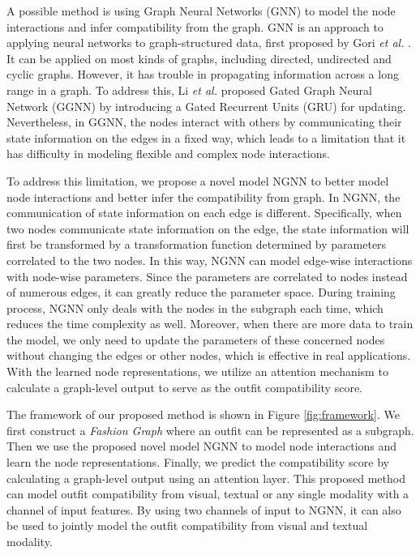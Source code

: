 \documentclass[sigconf]{acmart}
\begin{document}
A possible method is using Graph Neural Networks (GNN) to model the node interactions and infer compatibility from the graph.
GNN is an approach to applying neural networks to graph-structured data, first proposed by Gori \emph{et al.} \cite{gori2005new}.
It can be applied on most kinds of graphs, including directed, undirected and cyclic graphs. However, it has trouble in propagating information across a long range in a graph. To address this, Li \emph{et al.} \cite{li2015gated} proposed Gated Graph Neural Network (GGNN) by introducing a Gated Recurrent Units (GRU) for updating. Nevertheless, in GGNN, the nodes interact with others by communicating their state information on the edges in a fixed way, which leads to a limitation that it has difficulty in modeling flexible and complex node interactions.


To address this limitation, we propose a novel model NGNN to better model node interactions and better infer the compatibility from graph.
In NGNN, the communication of state information on each edge is different.
Specifically, when two nodes communicate state information on the edge, the state information will first be transformed by a transformation function determined by parameters correlated to the two nodes.
In this way, NGNN can model edge-wise interactions with node-wise parameters.
Since the parameters are correlated to nodes instead of numerous edges, it can greatly reduce the parameter space.
During training process, NGNN only deals with the nodes in the subgraph each time, which reduces the time complexity as well. Moreover, when there are more data to train the model, we only need to update the parameters of these concerned nodes without changing the edges or other nodes, which is effective in real applications.
With the learned node representations, we utilize an attention mechanism to calculate a graph-level output to serve as the outfit compatibility score.



The framework of our proposed method is shown in Figure \ref{fig:framework}.
We first construct a \emph{Fashion Graph} where an outfit can be represented as a subgraph. Then we use the proposed novel model NGNN to model node interactions and learn the node representations.
Finally, we predict the compatibility score by calculating a graph-level output using an attention layer.
This proposed method can model outfit compatibility from visual, textual or any single modality with a channel of input features.
By using two channels of input to NGNN, it can also be used to jointly model the outfit compatibility from visual and textual modality.
\end{document}
